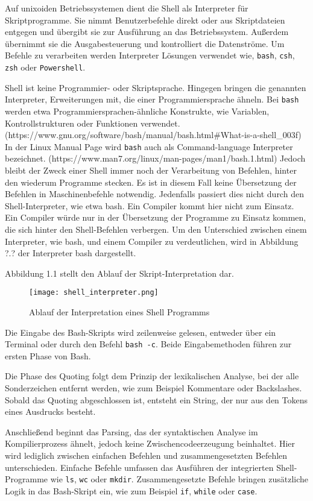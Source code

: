Auf unixoiden Betriebssystemen dient die Shell als Interpreter für Skriptprogramme. Sie nimmt Benutzerbefehle direkt oder aus Skriptdateien entgegen und übergibt sie zur Ausführung an das Betriebssystem. Außerdem übernimmt sie die Ausgabesteuerung und kontrolliert die Datenströme. 
Um Befehle zu verarbeiten werden Interpreter Lösungen verwendet wie, \verb+bash+, \verb+csh+, \verb+zsh+ oder \verb+Powershell+.

Shell ist keine Programmier- oder Skriptsprache. Hingegen bringen die genannten Interpreter, Erweiterungen mit, die einer Programmiersprache ähneln. Bei \verb+bash+ werden etwa Programmiersprachen-ähnliche Konstrukte, wie Variablen, Kontrollstrukturen oder Funktionen verwendet. (https://www.gnu.org/software/bash/manual/bash.html#What-is-a-shell_003f)
In der Linux Manual Page wird \verb+bash+ auch als Command-language Interpreter bezeichnet. (https://www.man7.org/linux/man-pages/man1/bash.1.html)
Jedoch bleibt der Zweck einer Shell immer noch der Verarbeitung von Befehlen, hinter den wiederum Programme stecken. Es ist in diesem Fall keine Übersetzung der Befehlen in Maschinenbefehle notwendig. Jedenfalls passiert dies nicht durch den Shell-Interpreter, wie etwa bash. Ein Compiler kommt hier nicht zum Einsatz. Ein Compiler würde nur in der Übersetzung der Programme zu Einsatz kommen, die sich hinter den Shell-Befehlen verbergen. Um den Unterschied zwischen einem Interpreter, wie bash, und einem Compiler zu verdeutlichen, wird in Abbildung ?.? der Interpreter bash dargestellt.


Abbildung 1.1 stellt den Ablauf der Skript-Interpretation dar.
\begin{figure}[h]
  \centering
  \caption{Ablauf der Interpretation eines Shell Programms}
  \texttt{[image: shell\_interpreter.png]}
  \label{fig:shell}
\end{figure}
\pagebreak

Die Eingabe des Bash-Skripts wird zeilenweise gelesen, entweder über ein Terminal oder durch den Befehl \verb+bash -c+. Beide Eingabemethoden führen zur ersten Phase von Bash.

Die Phase des Quoting folgt dem Prinzip der lexikalischen Analyse, bei der alle Sonderzeichen entfernt werden, wie zum Beispiel Kommentare oder Backslashes. Sobald das Quoting abgeschlossen ist, entsteht ein String, der nur aus den Tokens eines Ausdrucks besteht.

Anschließend beginnt das Parsing, das der syntaktischen Analyse im Kompilierprozess ähnelt, jedoch keine Zwischencodeerzeugung beinhaltet. Hier wird lediglich zwischen einfachen Befehlen und zusammengesetzten Befehlen unterschieden. Einfache Befehle umfassen das Ausführen der integrierten Shell-Programme wie \verb+ls+, \verb+wc+ oder \verb+mkdir+. Zusammengesetzte Befehle bringen zusätzliche Logik in das Bash-Skript ein, wie zum Beispiel \verb+if+, \verb+while+ oder \verb+case+.

